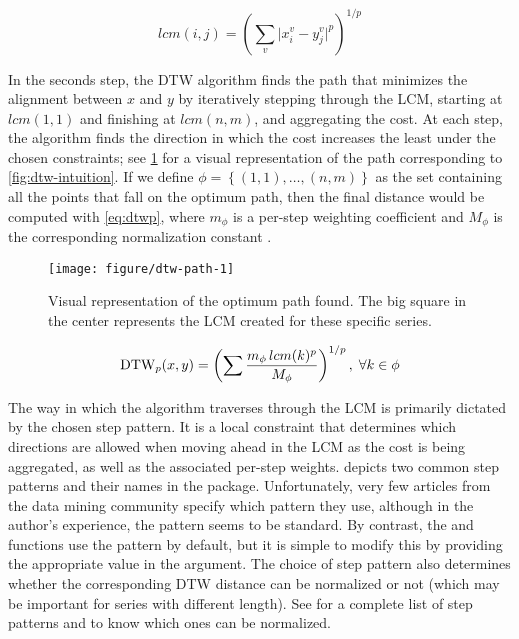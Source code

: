 \begin{equation}
\label{eq:lcm}
lcm(i,j) = \left( \sum_v \lvert x^v_i - y^v_j \rvert ^ p \right) ^ {1/p}
\end{equation}

In the seconds step,
the DTW algorithm finds the path that minimizes the alignment between $x$ and $y$ by iteratively stepping through the LCM,
starting at $lcm(1,1)$ and finishing at $lcm(n,m)$,
and aggregating the cost.
At each step, the algorithm finds the direction in which the cost increases the least under the chosen constraints;
see \cref{fig:dtw-path} for a visual representation of the path corresponding to \cref{fig:dtw-intuition}.
If we define $\phi = \left\{ (1,1), \ldots, (n,m) \right\}$ as the set containing all the points that fall on the optimum path,
then the final distance would be computed with \cref{eq:dtwp},
where $m_\phi$ is a per-step weighting coefficient and $M_\phi$ is the corresponding normalization constant \citep{giorgino2009}.

\begin{figure}[htbp]

{\centering \texttt{[image: figure/dtw-path-1]}

}

\caption{Visual representation of the optimum path found. The big square in the center represents the LCM created for these specific series.}\label{fig:dtw-path}
\end{figure}

\begin{equation}
\label{eq:dtwp}
\text{DTW}_p{}(x,y) = \left( \sum \frac{m_\phi \, lcm(k) ^ p}{M_\phi} \right) ^ {1/p}, \; \forall k \in \phi
\end{equation}

The way in which the algorithm traverses through the LCM is primarily dictated by the chosen step pattern.
It is a local constraint that determines which directions are allowed when moving ahead in the LCM as the cost is being aggregated,
as well as the associated per-step weights.
 depicts two common step patterns and their names in the  package.
Unfortunately, very few articles from the data mining community specify which pattern they use,
although in the author's experience,
the  pattern seems to be standard.
By contrast, the  and  functions use the  pattern by default,
but it is simple to modify this by providing the appropriate value in the  argument.
The choice of step pattern also determines whether the corresponding DTW distance can be normalized or not
(which may be important for series with different length).
See \citet{giorgino2009} for a complete list of step patterns and to know which ones can be normalized.

